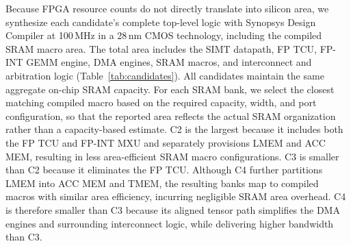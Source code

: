 \documentclass[sigconf,anonymous,nonacm]{acmart}
\newcommand{\fpint}{FP-INT}
\begin{document}

Because FPGA resource counts do not directly translate into silicon area, we synthesize each candidate's complete top-level logic with Synopsys Design Compiler at 100\,MHz in a 28\,nm CMOS technology, including the compiled SRAM macro area.
The total area includes the SIMT datapath, FP TCU, \fpint{} GEMM engine, DMA engines, SRAM macros, and interconnect and arbitration logic (Table~\ref{tab:candidates}).
All candidates maintain the same aggregate on-chip SRAM capacity. For each SRAM bank, we select the closest matching compiled macro based on the required capacity, width, and port configuration, so that the reported area reflects the actual SRAM organization rather than a capacity-based estimate. C2 is the largest because it includes both the FP TCU and FP-INT MXU and separately provisions LMEM and ACC MEM, resulting in less area-efficient SRAM macro configurations. C3 is smaller than C2 because it eliminates the FP TCU. Although C4 further partitions LMEM into ACC MEM and TMEM, the resulting banks map to compiled macros with similar area efficiency, incurring negligible SRAM area overhead. C4 is therefore smaller than C3 because its aligned tensor path simplifies the DMA engines and surrounding interconnect logic, while delivering higher bandwidth than C3.
\end{document}

